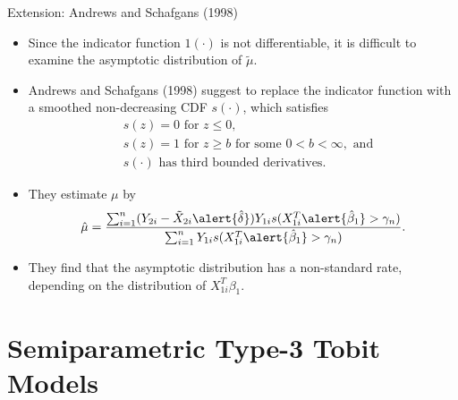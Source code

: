 \documentclass[xcolor=svgnames,dvipdfmx,cjk]{beamer}
\theoremstyle{example}
\begin{document}
\begin{frame}{Extension: Andrews and Schafgans (1998)}
      \begin{itemize}
            \item Since the indicator function $1(\cdot)$ is not differentiable,
                  it is difficult to examine the asymptotic distribution of $\tilde{\mu}$.
            \item Andrews and Schafgans (1998) suggest to replace the indicator function 
                  with a smoothed non-decreasing CDF $s(\cdot)$, which satisfies
                  \begin{align*}
                        & s(z) = 0 \text{ for } z \leq 0, \\
                        & s(z) = 1 \text{ for } z \geq b \text{ for some } 0 < b < \infty, \text{ and} \\
                        & s(\cdot)  \text{ has third bounded derivatives.} 
                  \end{align*} 
            \item They estimate $\mu$ by
                  \begin{align*}
                        \hat{\mu} = \frac{
                              \sum_{i=1}^n (Y_{2i} - \tilde{X}_{2i}\alert{\hat{\delta}}) Y_{1i} s(X_{1i}^T \alert{\hat{\beta}_1} > \gamma_n)
                        }{
                              \sum_{i=1}^n  Y_{1i} s(X_{1i}^T \alert{\hat{\beta}_1} > \gamma_n)
                        }.
                  \end{align*}
            \item They find that the asymptotic distribution has a non-standard rate, depending on the distribution of $X_{1i}^T \beta_1$.
      \end{itemize}
\end{frame}


\section{Semiparametric Type-3 Tobit Models}
\end{document}
